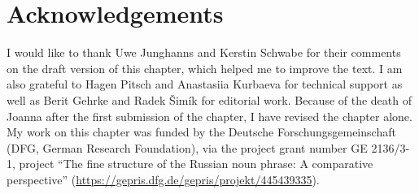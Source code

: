 \documentclass[output=paper,colorlinks,citecolor=brown]{langscibook}
\begin{document}

\section*{Acknowledgements}

I would like to thank Uwe Junghanns and Kerstin Schwabe for their comments on the draft version of this chapter, which helped me to improve the text. I am also grateful to Hagen Pitsch and Anastasiia Kurbaeva for technical support as well as Berit Gehrke and Radek Šimík for editorial work. Because of the death of Joanna after the first submission of the chapter, I have revised the chapter alone. My work on this chapter was funded by the Deutsche Forschungsgemeinschaft (DFG, German Research Foundation), via the project grant number GE 2136/3-1, project ``The fine structure of the Russian noun phrase: A comparative perspective'' (\url{https://gepris.dfg.de/gepris/projekt/445439335}).


\sloppy
\printbibliography[heading=subbibliography,notkeyword=this]


\cleardoublepage
\end{document}
